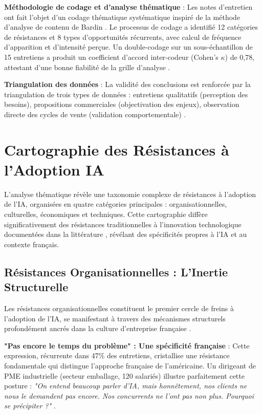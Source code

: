 \textbf{Méthodologie de codage et d'analyse thématique} : Les notes d'entretien ont fait l'objet d'un codage thématique systématique inspiré de la méthode d'analyse de contenu de Bardin \cite{bardin2013analyse}. Le processus de codage a identifié 12 catégories de résistances et 8 types d'opportunités récurrents, avec calcul de fréquence d'apparition et d'intensité perçue. Un double-codage sur un sous-échantillon de 15 entretiens a produit un coefficient d'accord inter-codeur (Cohen's $\kappa$) de 0,78, attestant d'une bonne fiabilité de la grille d'analyse \cite{cohen1960coefficient}.

\textbf{Triangulation des données} : La validité des conclusions est renforcée par la triangulation de trois types de données : entretiens qualitatifs (perception des besoins), propositions commerciales (objectivation des enjeux), observation directe des cycles de vente (validation comportementale) \cite{denzin2017research}.

\section{Cartographie des Résistances à l'Adoption IA}

L'analyse thématique révèle une taxonomie complexe de résistances à l'adoption de l'IA, organisées en quatre catégories principales : organisationnelles, culturelles, économiques et techniques. Cette cartographie diffère significativement des résistances traditionnelles à l'innovation technologique documentées dans la littérature \cite{ram1987consumer}, révélant des spécificités propres à l'IA et au contexte français.

\subsection{Résistances Organisationnelles : L'Inertie Structurelle}

Les résistances organisationnelles constituent le premier cercle de freins à l'adoption de l'IA, se manifestant à travers des mécanismes structurels profondément ancrés dans la culture d'entreprise française \cite{hofstede2001culture}.

\textbf{"Pas encore le temps du problème" : Une spécificité française} : Cette expression, récurrente dans 47\% des entretiens, cristallise une résistance fondamentale qui distingue l'approche française de l'américaine. Un dirigeant de PME industrielle (secteur emballage, 120 salariés) illustre parfaitement cette posture : \emph{"On entend beaucoup parler d'IA, mais honnêtement, nos clients ne nous le demandent pas encore. Nos concurrents ne l'ont pas non plus. Pourquoi se précipiter ?"} \cite{luwai2025meetings}. 

